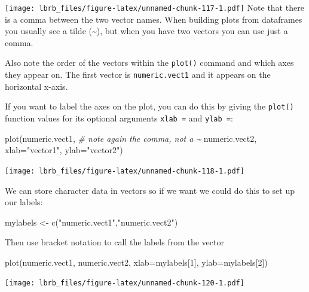 \documentclass[
]{book}
\newenvironment{Shaded}{\begin{snugshade}}{\end{snugshade}}
\newcommand{\AttributeTok}[1]{\textcolor[rgb]{0.77,0.63,0.00}{#1}}
\newcommand{\CommentTok}[1]{\textcolor[rgb]{0.56,0.35,0.01}{\textit{#1}}}
\newcommand{\DecValTok}[1]{\textcolor[rgb]{0.00,0.00,0.81}{#1}}
\newcommand{\FunctionTok}[1]{\textcolor[rgb]{0.00,0.00,0.00}{#1}}
\newcommand{\NormalTok}[1]{#1}
\newcommand{\OtherTok}[1]{\textcolor[rgb]{0.56,0.35,0.01}{#1}}
\newcommand{\StringTok}[1]{\textcolor[rgb]{0.31,0.60,0.02}{#1}}
\begin{document}
\texttt{[image: lbrb\_files/figure-latex/unnamed-chunk-117-1.pdf]}
Note that there is a comma between the two vector names. When building plots from dataframes you usually see a tilde (\textasciitilde), but when you have two vectors you can use just a comma.

Also note the order of the vectors within the \texttt{plot()} command and which axes they appear on. The first vector is \texttt{numeric.vect1} and it appears on the horizontal x-axis.

If you want to label the axes on the plot, you can do this by giving the \texttt{plot()} function values for its optional arguments \texttt{xlab\ =} and \texttt{ylab\ =}:

\begin{Shaded}
\begin{Highlighting}[]
\FunctionTok{plot}\NormalTok{(numeric.vect1,   }\CommentTok{\# note again the comma, not a \textasciitilde{}}
\NormalTok{     numeric.vect2, }
     \AttributeTok{xlab=}\StringTok{"vector1"}\NormalTok{, }
     \AttributeTok{ylab=}\StringTok{"vector2"}\NormalTok{)}
\end{Highlighting}
\end{Shaded}

\texttt{[image: lbrb\_files/figure-latex/unnamed-chunk-118-1.pdf]}

We can store character data in vectors so if we want we could do this to set up our labels:

\begin{Shaded}
\begin{Highlighting}[]
\NormalTok{mylabels }\OtherTok{\textless{}{-}}  \FunctionTok{c}\NormalTok{(}\StringTok{"numeric.vect1"}\NormalTok{,}\StringTok{"numeric.vect2"}\NormalTok{)}
\end{Highlighting}
\end{Shaded}

Then use bracket notation to call the labels from the vector

\begin{Shaded}
\begin{Highlighting}[]
\FunctionTok{plot}\NormalTok{(numeric.vect1, }
\NormalTok{     numeric.vect2, }
     \AttributeTok{xlab=}\NormalTok{mylabels[}\DecValTok{1}\NormalTok{],}
     \AttributeTok{ylab=}\NormalTok{mylabels[}\DecValTok{2}\NormalTok{])}
\end{Highlighting}
\end{Shaded}

\texttt{[image: lbrb\_files/figure-latex/unnamed-chunk-120-1.pdf]}
\end{document}

